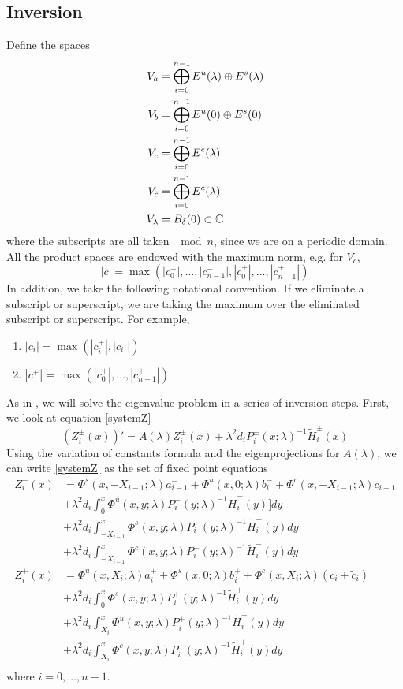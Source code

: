 \documentclass[thesis.tex]{subfiles}
\begin{document}
\subsection{Inversion}

Define the spaces
\begin{align*}
V_a &= \bigoplus_{i=0}^{n-1} E^u(\lambda) \oplus E^s(\lambda) \\
V_b &= \bigoplus_{i=0}^{n-1} E^u(0) \oplus E^s(0) \\
V_c &= \bigoplus_{i=0}^{n-1} E^c(\lambda) \\
V_{\tilde{c}} &= \bigoplus_{i=0}^{n-1} E^c(\lambda) \\
V_\lambda &= B_\delta(0) \subset \mathbb{C}
\end{align*}
where the subscripts are all taken $\mod n$, since we are on a periodic domain. All the product spaces are endowed with the maximum norm, e.g. for $V_c$, 
\[
|c| = \max(|c_0^-|, \dots, |c_{n-1}^-|, |c_0^+|, \dots, |c_{n-1}^+|)
\]
In addition, we take the following notational convention. If we eliminate a subscript or superscript, we are taking the maximum over the eliminated subscript or superscript. For example,
\begin{enumerate}
	\item $|c_i| = \max(|c_i^+|, |c_i^-|)$ 
	\item $|c^+| = \max(|c_0^+|, \dots, |c_{n-1}^+|)$
\end{enumerate}

As in \cite{Sandstede1998}, we will solve the eigenvalue problem in a series of inversion steps. First, we look at equation \eqref{systemZ}
\[
(Z_i^\pm(x))' = A(\lambda) Z_i^\pm(x) + \lambda^2 d_i P_i^\pm(x; \lambda)^{-1} \tilde{H}_i^\pm(x) 
\]
Using the variation of constants formula and the eigenprojections for $A(\lambda)$, we can write \eqref{systemZ} as the set of fixed point equations
\begin{equation}\label{Zfpeq}
\begin{aligned}
Z_i^-(x) &= \Phi^s(x, -X_{i-1}; \lambda) a_{i-1}^- + \Phi^u(x, 0; \lambda) b_i^- + \Phi^c(x, -X_{i-1}; \lambda) c_{i-1} \\
&+ \lambda^2 d_i \int_0^x \Phi^u(x, y; \lambda) P_i^-(y; \lambda)^{-1} \tilde{H}_i^-(y)] dy \\
&+ \lambda^2 d_i \int_{-X_{i-1}}^x \Phi^s(x, y; \lambda) P_i^-(y; \lambda)^{-1} \tilde{H}_i^-(y) dy \\
&+ \lambda^2 d_i \int_{-X_{i-1}}^x \Phi^c(x, y; \lambda) P_i^-(y; \lambda)^{-1} \tilde{H}_i^-(y) dy  \\ 
Z_i^+(x) &= \Phi^u(x, X_i; \lambda) a_i^+ + \Phi^s(x, 0; \lambda) b_i^+ + \Phi^c(x, X_i; \lambda)(c_i + \tilde{c}_i) \\
&+ \lambda^2 d_i \int_0^x \Phi^s(x, y; \lambda) P_i^+(y; \lambda)^{-1} \tilde{H}_i^+(y) dy \\
&+ \lambda^2 d_i \int_{X_i}^x \Phi^u(x, y; \lambda) P_i^+(y; \lambda)^{-1} \tilde{H}_i^+(y) dy \\
&+ \lambda^2 d_i \int_{X_i}^x \Phi^c(x, y; \lambda) P_i^+(y; \lambda)^{-1} \tilde{H}_i^+(y) dy \\
\end{aligned}
\end{equation}
where $i = 0, \dots, n-1$. 
\end{document}
